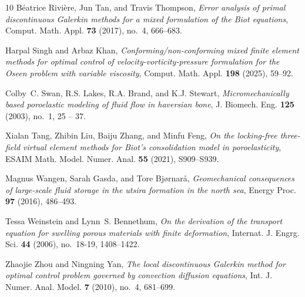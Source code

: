 \documentclass{amsart}
\begin{document}
\begin{thebibliography}{10}
B\'eatrice Rivi\`ere, Jun Tan, and Travis Thompson, \emph{Error analysis of
  primal discontinuous {G}alerkin methods for a mixed formulation of the {B}iot
  equations}, Comput. Math. Appl. \textbf{73} (2017), no.~4, 666--683.

Harpal Singh and Arbaz Khan, \emph{Conforming/non-conforming mixed finite
  element methods for optimal control of velocity-vorticity-pressure
  formulation for the {O}seen problem with variable viscosity}, Comput. Math.
  Appl. \textbf{198} (2025), 59--92.

Colby~C. Swan, R.S. Lakes, R.A. Brand, and K.J. Stewart,
  \emph{Micromechanically based poroelastic modeling of fluid flow in haversian
  bone}, J. Biomech. Eng. \textbf{125} (2003), no.~1, 25 – 37.

Xialan Tang, Zhibin Liu, Baiju Zhang, and Minfu Feng, \emph{On the locking-free
  three-field virtual element methods for {B}iot's consolidation model in
  poroelasticity}, ESAIM Math. Model. Numer. Anal. \textbf{55} (2021),
  S909--S939. 

Magnus Wangen, Sarah Gasda, and Tore Bj{\o}rnar{\aa}, \emph{Geomechanical
  consequences of large-scale fluid storage in the utsira formation in the
  north sea}, Energy Proc. \textbf{97} (2016), 486--493.

Tessa Weinstein and Lynn~S. Bennethum, \emph{On the derivation of the transport
  equation for swelling porous materials with finite deformation}, Internat. J.
  Engrg. Sci. \textbf{44} (2006), no.~18-19, 1408--1422. 

Zhaojie Zhou and Ningning Yan, \emph{The local discontinuous {G}alerkin method
  for optimal control problem governed by convection diffusion equations}, Int.
  J. Numer. Anal. Model. \textbf{7} (2010), no.~4, 681--699. 

\end{thebibliography}

%
\end{document}
